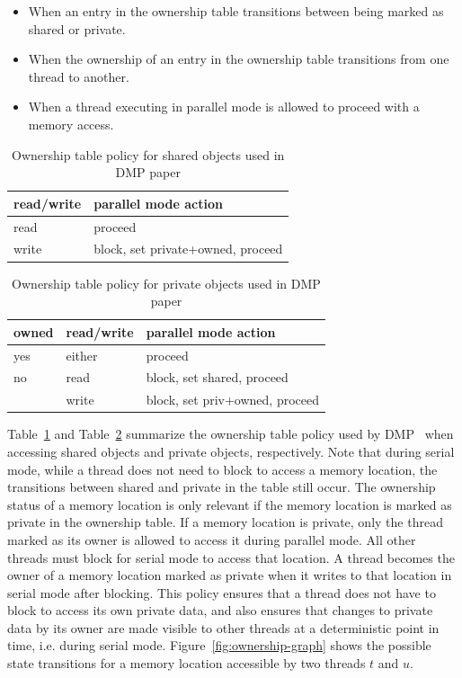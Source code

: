 \begin{itemize}
\item When an entry in the ownership table transitions between being
  marked as shared or private.

\item When the ownership of an entry in the ownership table
  transitions from one thread to another.

\item When a thread executing in parallel mode is allowed to proceed
  with a memory access.
\end{itemize}

\begin{table}
  \begin{tabular}{l|l}
    read/write &  parallel mode action              \\
    \hline
    read       &  proceed                           \\
    write      &  block, set private+owned, proceed \\
  \end{tabular}
  \caption{Ownership table policy for shared objects used in DMP paper}
  \label{table:ownership-policy-shared}
\end{table}

\begin{table}
  \begin{tabular}{l|l|l}
    owned & read/write &  parallel mode action           \\
    \hline       
    yes   &  either    &  proceed                        \\
    no    &  read      &  block, set shared, proceed     \\
          &  write     &  block, set priv+owned, proceed \\
  \end{tabular}
  \caption{Ownership table policy for private objects used in DMP paper}
  \label{table:ownership-policy-private}
\end{table}

Table~\ref{table:ownership-policy-shared} and
Table~\ref{table:ownership-policy-private} summarize the ownership
table policy used by DMP~\cite{dmp} when accessing shared objects and
private objects, respectively.  Note that during serial mode, while a
thread does not need to block to access a memory location, the
transitions between shared and private in the table still occur.  The
ownership status of a memory location is only relevant if the memory
location is marked as private in the ownership table.  If a memory
location is private, only the thread marked as its owner is allowed to
access it during parallel mode.  All other threads must block for
serial mode to access that location.  A thread becomes the owner of a
memory location marked as private when it writes to that location in
serial mode after blocking.  This policy ensures that a thread does
not have to block to access its own private data, and also ensures
that changes to private data by its owner are made visible to other
threads at a deterministic point in time, i.e. during serial mode.
Figure~\ref{fig:ownership-graph} shows the possible state transitions
for a memory location accessible by two threads $t$ and $u$.

